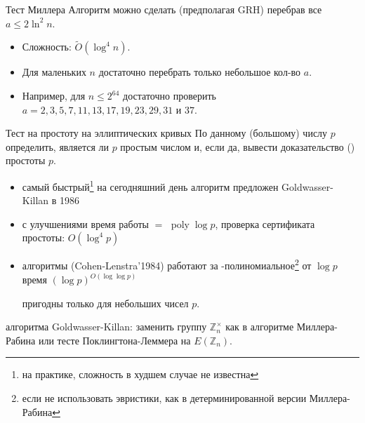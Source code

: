 \documentclass{beamer}
\begin{document}
\begin{frame}{Тест Миллера}    
	Алгоритм можно сделать  (предполагая GRH) перебрав все $a \leq 2 \ln^2{n}$.
	
	\vspace{0.5em}

	\begin{itemize}
		\item Сложность: $\widetilde{O}(\log^4{n})$.
		\item Для маленьких $n$ достаточно перебрать только небольшое кол-во $a$.
		\item Например, для $n \leq 2^{64}$ достаточно проверить $a = 2, 3, 5, 7, 11, 13, 17, 19, 23, 29, 31$ и $37$. 
	\end{itemize}
\end{frame}

\begin{frame}{Тест на простоту на эллиптических кривых}
 По данному (большому) числу $p$ определить, является ли $p$ простым числом и, если да, вывести доказательство () простоты $p$.

\vspace*{0.5em}

\begin{itemize}
    \item самый быстрый\footnote{на практике, сложность в худшем случае не известна} на сегодняшний день алгоритм предложен Goldwasser-Killan в 1986
    \item с улучшениями время работы $=$ $\operatorname{poly}\log p$, проверка сертификата простоты: $O(\log^4 p)$
\end{itemize}
\end{frame}

\begin{frame}
\begin{itemize}
\item {} алгоритмы (Cohen-Lenstra'1984) работают за -полиномиальное\footnote{если не использовать эвристики, как в детерминированной версии Миллера-Рабина} от $\log p$ время $(\log p)^{O(\log\log p)}$

\structure{$\implies$} пригодны только для небольших чисел $p$.
\end{itemize}

\vspace{1em}
 алгоритма Goldwasser-Killan: заменить группу $\mathbb{Z}_n^\times$ как в алгоритме Миллера-Рабина или тесте Поклингтона-Леммера на $E(\mathbb{Z}_n)$.
\end{frame}
\end{document}
